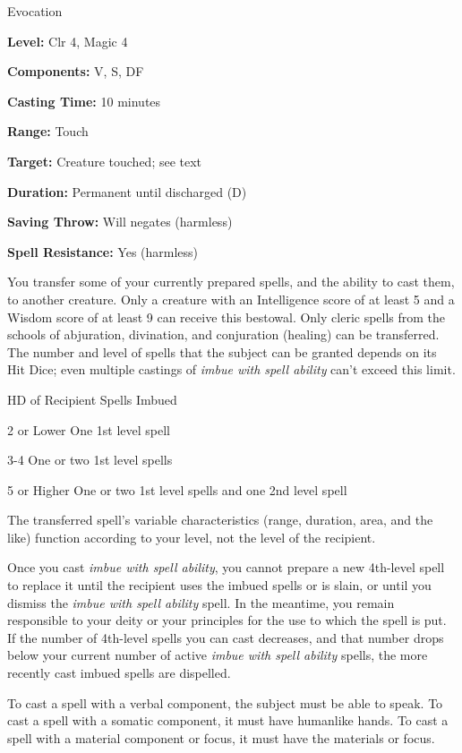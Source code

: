 
Evocation

\textbf{Level:} Clr 4, Magic 4

\textbf{Components:} V, S, DF

\textbf{Casting Time:} 10 minutes

\textbf{Range:} Touch

\textbf{Target:} Creature touched; see text

\textbf{Duration:} Permanent until discharged (D)

\textbf{Saving Throw:} Will negates (harmless)

\textbf{Spell Resistance:} Yes (harmless)

You transfer some of your currently prepared spells, and the ability to cast them, 
to another creature. Only a creature with an Intelligence score of at least 5 and 
a Wisdom score of at least 9 can receive this bestowal. Only cleric spells from 
the schools of abjuration, divination, and conjuration (healing) can be transferred. 
The number and level of spells that the subject can be granted depends on its Hit 
Dice; even multiple castings of \textit{imbue with spell ability} can't exceed 
this limit.

\begin{description*}
\item[HD of Recipient] Spells Imbued
\item[2 or Lower] One 1st level spell
\item[3-4] One or two 1st level spells
\item[5 or Higher] One or two 1st level spells and one 2nd level spell
\end{description*}

The transferred spell's variable characteristics (range, duration, area, and the 
like) function according to your level, not the level of the recipient.

Once you cast \textit{imbue with spell ability}, you cannot prepare a new 4th-level 
spell to replace it until the recipient uses the imbued spells or is slain, or 
until you dismiss the \textit{imbue with spell ability} spell. In the meantime, 
you remain responsible to your deity or your principles for the use to which the 
spell is put. If the number of 4th-level spells you can cast decreases, and that 
number drops below your current number of active \textit{imbue with spell ability 
}spells, the more recently cast imbued spells are dispelled.

To cast a spell with a verbal component, the subject must be able to speak. To 
cast a spell with a somatic component, it must have humanlike hands. To cast a 
spell with a material component or focus, it must have the materials or focus.

